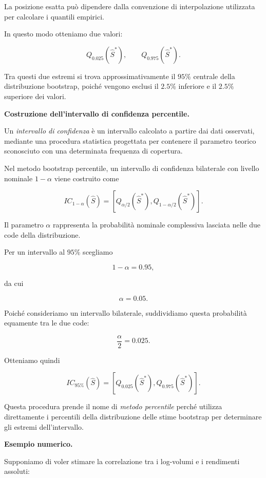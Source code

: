 La posizione esatta può dipendere dalla convenzione
di interpolazione utilizzata per calcolare
i quantili empirici.

In questo modo otteniamo due valori:

\[
Q_{0.025}(\widehat{S}^*),
\qquad
Q_{0.975}(\widehat{S}^*).
\]

Tra questi due estremi si trova approssimativamente
il $95\%$ centrale della distribuzione bootstrap,
poiché vengono esclusi il $2.5\%$ inferiore
e il $2.5\%$ superiore dei valori.

\medskip

\noindent
\textbf{Costruzione dell'intervallo di confidenza percentile.}

Un \textit{intervallo di confidenza} è un intervallo
calcolato a partire dai dati osservati, mediante
una procedura statistica progettata per contenere
il parametro teorico sconosciuto con una determinata
frequenza di copertura.

Nel metodo bootstrap percentile, un intervallo
di confidenza bilaterale con livello nominale
$1-\alpha$ viene costruito come

\[
IC_{1-\alpha}(\widehat{S})
=
\left[
Q_{\alpha/2}(\widehat{S}^*),
Q_{1-\alpha/2}(\widehat{S}^*)
\right].
\]

Il parametro $\alpha$ rappresenta la probabilità
nominale complessiva lasciata nelle due code
della distribuzione.

Per un intervallo al $95\%$ scegliamo

\[
1-\alpha=0.95,
\]

da cui

\[
\alpha=0.05.
\]

Poiché consideriamo un intervallo bilaterale,
suddividiamo questa probabilità equamente
tra le due code:

\[
\frac{\alpha}{2}=0.025.
\]

Otteniamo quindi

\[
\boxed{
IC_{95\%}(\widehat{S})
=
\left[
Q_{0.025}(\widehat{S}^*),
Q_{0.975}(\widehat{S}^*)
\right].
}
\]

Questa procedura prende il nome di
\textit{metodo percentile} perché utilizza
direttamente i percentili della distribuzione
delle stime bootstrap per determinare
gli estremi dell'intervallo.

\medskip

\noindent
\textbf{Esempio numerico.}

Supponiamo di voler stimare la correlazione
tra i log-volumi e i rendimenti assoluti:

